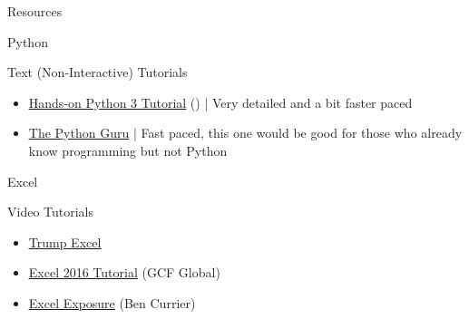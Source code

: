 \documentclass[11pt]{resume}
\begin{document}
\begin{section}{Resources}
\begin{subsection}{Python}
\begin{subsubsection}{Text (Non-Interactive) Tutorials}
\begin{itemize}
(Wikibooks)
|
Fairly detailed and approachable
\item \textcolor{blue}{\underline{\href{http://anh.cs.luc.edu//python/hands-on/3.1/handsonHtml/index.html}{Hands-on Python 3 Tutorial}}}
()
|
Very detailed and a bit faster paced
\item \textcolor{blue}{\underline{\href{https://thepythonguru.com/}{The Python Guru}}}
|
Fast paced, this one would be good for those who already know programming but not Python
\end{itemize}
\end{subsubsection}
\end{subsection}
\begin{subsection}{Excel}
\begin{subsubsection}{Video Tutorials}
\begin{itemize}
\item \textcolor{blue}{\underline{\href{https://trumpexcel.com/learn-excel/}{Trump Excel}}}
\item \textcolor{blue}{\underline{\href{https://edu.gcfglobal.org/en/excel2016/}{Excel 2016 Tutorial}}}
(GCF Global)
\item \textcolor{blue}{\underline{\href{https://excelexposure.com/lesson-guide/}{Excel Exposure}}}
(Ben Currier)
\end{itemize}
\end{subsubsection}
\end{subsection}
\end{section}
\end{document}

